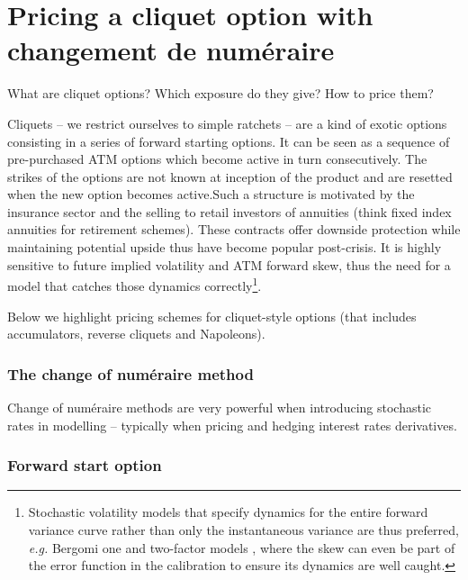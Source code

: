 \section{Pricing a cliquet option with changement de num\'eraire}

\begin{tcolorbox}[width=\linewidth, sharp corners=all, colback=white!95!black]
What are cliquet options? Which exposure do they give? How to price them?
\end{tcolorbox}

Cliquets -- we restrict ourselves to simple ratchets -- are a kind of exotic options consisting in a series of forward starting options. It can be seen as a sequence of pre-purchased ATM options which become active in turn consecutively. The strikes of the options are not known at inception of the product and are resetted when the new option becomes active.\newline Such a structure is motivated by the insurance sector and the selling to retail investors of annuities (think fixed index annuities for retirement schemes). These contracts offer downside protection while maintaining potential upside thus have become popular post-crisis. \newline It is highly sensitive to future implied volatility and ATM forward skew, thus the need for a model that catches those dynamics correctly\footnote{Stochastic volatility models that specify dynamics for the entire forward variance curve rather than only the instantaneous variance are thus preferred, \textit{e.g.} Bergomi one and two-factor models \cite{bergomi2004smile, bergomi2005smile}, where the skew can even be part of the error function in the calibration to ensure its dynamics are well caught.}.

Below we highlight pricing schemes for cliquet-style options (that includes accumulators, reverse cliquets and Napoleons).

\subsubsection*{The change of num\'eraire method}

Change of num\'eraire methods are very powerful when introducing stochastic rates in modelling -- typically when pricing and hedging interest rates derivatives. 

\subsubsection*{Forward start option}

